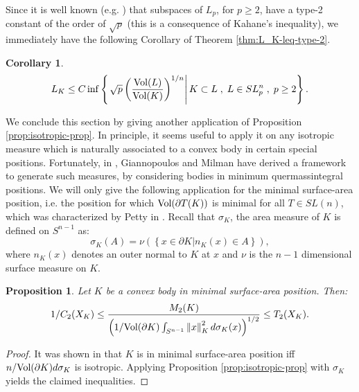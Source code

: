 \documentclass[12pt,oneside]{amsart}
\newtheorem{cor}[thm]{Corollary}
\newtheorem{prop}[thm]{Proposition}
\theoremstyle{definition}
\theoremstyle{remark}
\theoremstyle{proof}
\numberwithin{equation}{section}
\newcommand{\norm}[1]{\left\Vert#1\right\Vert}
\newcommand{\set}[1]{\left\{#1\right\}}
\newcommand{\brac}[1]{\left(#1\right)}
\newcommand{\Vol}[1]{\textnormal{Vol} (#1)}
\newcommand{\VolRatio}[2]{\brac{\frac{\Vol{#1}}{\Vol{#2}}}^{1/n}}
\begin{document}
\medskip

Since it is well known (e.g. \cite{Milman-Schechtman-Book}) that
subspaces of $L_p$, for $p \geq 2$, have a type-2 constant of the
order of $\sqrt{p}$ (this is a consequence of Kahane's
inequality), we immediately have the following Corollary of
Theorem \ref{thm:L_K-leq-type-2}.

\begin{cor} \label{cor:L_K-leq-sqrt-p-geq-2}
\[
L_K \leq C \inf \set{\left . \sqrt{p} \VolRatio{L}{K} \right | K
\subset L \; , \; L \in SL_p^n \; , \; p \geq 2}.
\]
\end{cor}

\medskip

We conclude this section by giving another application of
Proposition \ref{prop:isotropic-prop}. In principle, it seems
useful to apply it on any isotropic measure which is naturally
associated to a convex body in certain special positions.
Fortunately, in \cite{Giannopoulos-Milman}, Giannopoulos and
Milman have derived a framework to generate such measures, by
considering bodies in minimum quermassintegral positions. We will
only give the following application for the minimal surface-area
position, i.e. the position for which $\Vol{\partial T(K)}$ is
minimal for all $T\in SL(n)$, which was characterized by Petty in
\cite{Petty}. Recall that $\sigma_K$, the area measure of $K$ is
defined on $S^{n-1}$ as:
\[
\sigma_K(A) = \nu\brac{\set{x \in \partial K | n_K(x) \in A}},
\]
where $n_K(x)$ denotes an outer normal to $K$ at $x$ and $\nu$ is
the $n-1$ dimensional surface measure on $K$.


\begin{prop}
Let $K$ be a convex body in minimal surface-area position. Then:
\[
1/C_2(X_K) \leq \frac{M_2(K)}{ \brac{1 / \Vol{\partial K}
\int_{S^{n-1}} \norm{x}_K^2 d\sigma_K(x)}^{1/2}}  \leq T_2(X_K).
\]
\end{prop}
\begin{proof}
It was shown in \cite{Petty} that $K$ is in minimal surface-area
position iff $n / \Vol{\partial K} d\sigma_K$ is isotropic.
Applying Proposition \ref{prop:isotropic-prop} with $\sigma_K$
yields the claimed inequalities.
\end{proof}
\end{document}
